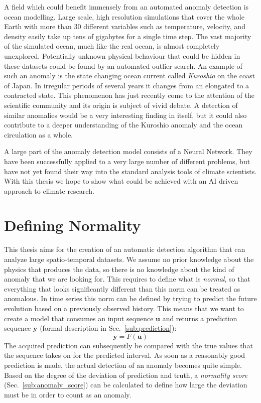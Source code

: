A field which could benefit immensely from an automated anomaly detection is
ocean modelling.  Large scale, high resolution simulations that cover the whole
Earth with more than 30 different variables such as temperature, velocity, and
density easily take up tens of gigabytes for a single time step. The vast
majority of the simulated ocean, much like the real ocean, is almost completely
unexplored.  Potentially unknown physical behaviour that could be hidden in
these datasets could be found by an automated outlier search. An example of
such an anomaly is the state changing ocean current called \emph{Kuroshio} on
the coast of Japan.  In irregular periods of several years it changes from an
elongated to a contracted state. This phenomenon has just recently come to the
attention of the scientific community and its origin is subject of vivid
debate. A detection of similar anomalies would be a very interesting finding in
itself, but it could also contribute to a deeper understanding of the Kuroshio
anomaly and the ocean circulation as a whole.

A large part of the anomaly detection model consists of a Neural Network. They
have been successfully applied to a very large number of different problems,
but have not yet found their way into the standard analysis tools of climate
scientists. With this thesis we hope to show what could be achieved with an AI
driven approach to climate research.



\section{Defining Normality}%
\label{sec:defining_what_is_normal}

This thesis aims for the creation of an automatic detection algorithm that can
analyze large spatio-temporal datasets. We assume no prior knowledge about the
physics that produces the data, so there is no knowledge about the kind of
anomaly that we are looking for.  This requires to define what is
{\em normal}, so that everything that looks significantly different than this
norm can be treated as anomalous.  In time series this norm can be defined by
trying to predict the future evolution based on a previously observed history.
This means that we want to create a model that consumes an input sequence
$\mathbf{u}$ and returns a prediction sequence $\mathbf{y}$ (formal description
in Sec.~\ref{sub:prediction}):
\begin{equation}
  \mathbf{y} = F(\mathbf{u})
\end{equation}
The acquired prediction can subsequently be compared with the true values that
the sequence takes on for the predicted interval.  As soon as a reasonably good
prediction is made, the actual detection of an anomaly becomes quite simple.
Based on the degree of the deviation of prediction and truth, a \emph{normality
score} (Sec.~\ref{sub:anomaly_score}) can be calculated to define how large the
deviation must be in order to count as an anomaly.


